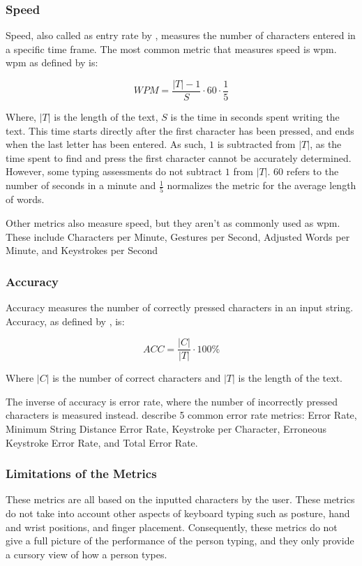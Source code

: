 \documentclass{report}
\begin{document}
\subsubsection{Speed}
Speed, also called as entry rate by \citeauthor{arif2009}, measures the number
of characters entered in a specific time frame. The most common metric that
measures speed is \ac{wpm}. \ac{wpm} as defined by \citeauthor{arif2009} is:

\begin{equation}
	WPM = \frac{|T| - 1}{S} \cdot 60 \cdot \frac{1}{5}
\end{equation}

Where, $|T|$ is the length of the text, $S$ is the time in seconds spent writing
the text. This time starts directly after the first character has been pressed,
and ends when the last letter has been entered. As such, $1$ is subtracted from
$|T|$, as the time spent to find and press the first character cannot be
accurately determined. However, some typing assessments do not subtract $1$ from
$|T|$. $60$ refers to the number of seconds in a minute and $\frac{1}{5}$
normalizes the metric for the average length of words.


Other metrics also measure speed, but they aren't as commonly used as \ac{wpm}.
These include Characters per Minute, Gestures per Second, Adjusted Words per
Minute, and Keystrokes per Second

\subsubsection{Accuracy}
Accuracy measures the number of correctly pressed characters in an input string.
Accuracy, as defined by \citeauthor{bartnik2021}, is:

\begin{equation}
	ACC = \frac{|C|}{|T|} \cdot 100\%
\end{equation}

Where $|C|$ is the number of correct characters and $|T|$ is the length of the
text.

The inverse of accuracy is error rate, where the number of incorrectly pressed
characters is measured instead. \citeauthor{arif2009} describe 5 common error
rate metrics: Error Rate, Minimum String Distance Error Rate, Keystroke per
Character, Erroneous Keystroke Error Rate, and Total Error Rate.

\subsubsection{Limitations of the Metrics}
These metrics are all based on the inputted characters by the user. These
metrics do not take into account other aspects of keyboard typing such as
posture, hand and wrist positions, and finger placement. Consequently, these
metrics do not give a full picture of the performance of the person typing, and
they only provide a cursory view of how a person types.
\end{document}
